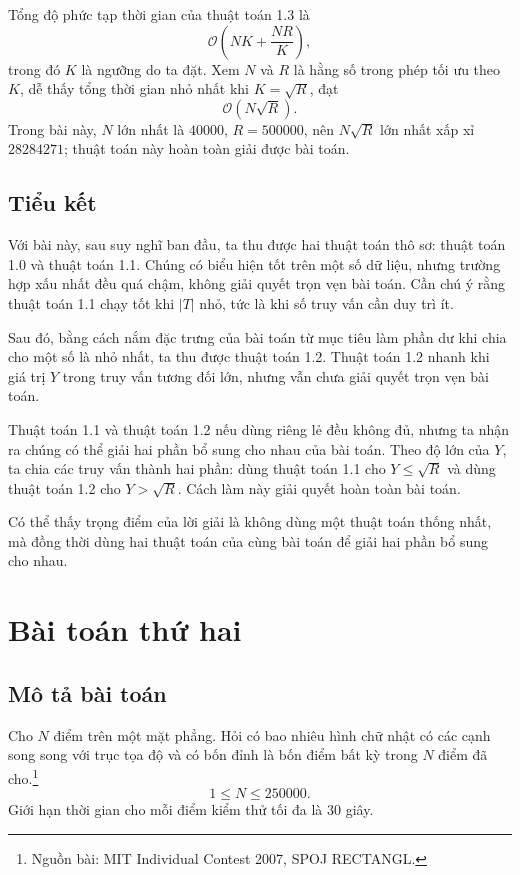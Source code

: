 \documentclass[11pt]{article}
\newcommand{\Oh}{\mathcal{O}}
\begin{document}
Tổng độ phức tạp thời gian của thuật toán 1.3 là
\[
  \Oh\left(NK+\frac{NR}{K}\right),
\]
trong đó $K$ là ngưỡng do ta đặt. Xem $N$ và $R$ là hằng số trong phép tối ưu
theo $K$, dễ thấy tổng thời gian nhỏ nhất khi $K=\sqrt{R}$, đạt
\[
  \Oh(N\sqrt{R}).
\]
Trong bài này, $N$ lớn nhất là $40000$, $R=500000$, nên
$N\sqrt{R}$ lớn nhất xấp xỉ $28284271$; thuật toán này hoàn toàn giải được bài
toán.

\subsection{Tiểu kết}

Với bài này, sau suy nghĩ ban đầu, ta thu được hai thuật toán thô sơ: thuật
toán 1.0 và thuật toán 1.1. Chúng có biểu hiện tốt trên một số dữ liệu, nhưng
trường hợp xấu nhất đều quá chậm, không giải quyết trọn vẹn bài toán. Cần chú
ý rằng thuật toán 1.1 chạy tốt khi $|T|$ nhỏ, tức là khi số truy vấn cần duy
trì ít.

Sau đó, bằng cách nắm đặc trưng của bài toán từ mục tiêu làm phần dư khi chia
cho một số là nhỏ nhất, ta thu được thuật toán 1.2. Thuật toán 1.2 nhanh khi
giá trị $Y$ trong truy vấn tương đối lớn, nhưng vẫn chưa giải quyết trọn vẹn
bài toán.

Thuật toán 1.1 và thuật toán 1.2 nếu dùng riêng lẻ đều không đủ, nhưng ta nhận
ra chúng có thể giải hai phần bổ sung cho nhau của bài toán. Theo độ lớn của
$Y$, ta chia các truy vấn thành hai phần: dùng thuật toán 1.1 cho
$Y\le\sqrt{R}$ và dùng thuật toán 1.2 cho $Y>\sqrt{R}$. Cách làm này giải
quyết hoàn toàn bài toán.

Có thể thấy trọng điểm của lời giải là không dùng một thuật toán thống nhất,
mà đồng thời dùng hai thuật toán của cùng bài toán để giải hai phần bổ sung
cho nhau.

\section{Bài toán thứ hai}

\subsection{Mô tả bài toán}

Cho $N$ điểm trên một mặt phẳng. Hỏi có bao nhiêu hình chữ nhật có các cạnh
song song với trục tọa độ và có bốn đỉnh là bốn điểm bất kỳ trong $N$ điểm đã
cho.\footnote{Nguồn bài: MIT Individual Contest 2007, SPOJ RECTANGL.}
\[
  1\le N\le 250000.
\]
Giới hạn thời gian cho mỗi điểm kiểm thử tối đa là $30$ giây.
\end{document}
